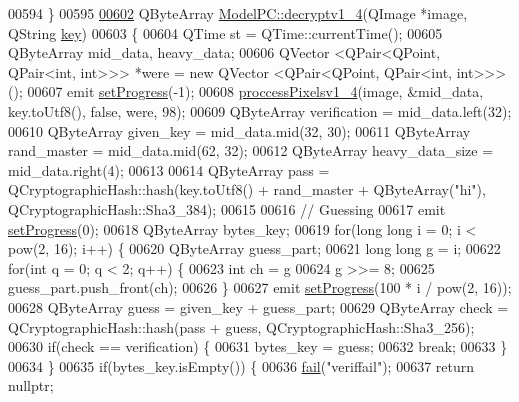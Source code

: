\begin{DoxyCode}
00594 \}
00595 
\hypertarget{modelpc_8cpp_source.tex_l00602}{}\hyperlink{class_model_p_c_a7a1f7d491e1bde16936190b9e90896b0}{00602} QByteArray \hyperlink{class_model_p_c_a7a1f7d491e1bde16936190b9e90896b0}{ModelPC::decryptv1\_4}(QImage *image, QString \hyperlink{namespace_errors_dict_setup_a09c268098d09ffb8e5504f30fa6d5dd9}{key})
00603 \{
00604     QTime st = QTime::currentTime();
00605     QByteArray mid\_data, heavy\_data;
00606     QVector <QPair<QPoint, QPair<int, int>>> *were = \textcolor{keyword}{new} QVector <QPair<QPoint, QPair<int, int>>>();
00607     emit \hyperlink{class_model_p_c_afdcd80f0ed5062e145a71f09b0897547}{setProgress}(-1);
00608     \hyperlink{class_model_p_c_a5cdb4d1d61ff62ee9d45b496a7dbf1fb}{proccessPixelsv1\_4}(image, &mid\_data, key.toUtf8(), \textcolor{keyword}{false}, were, 98);
00609     QByteArray verification = mid\_data.left(32);
00610     QByteArray given\_key = mid\_data.mid(32, 30);
00611     QByteArray rand\_master = mid\_data.mid(62, 32);
00612     QByteArray heavy\_data\_size = mid\_data.right(4);
00613 
00614     QByteArray pass = QCryptographicHash::hash(key.toUtf8() + rand\_master + QByteArray(\textcolor{stringliteral}{"hi"}), 
      QCryptographicHash::Sha3\_384);
00615 
00616     \textcolor{comment}{// Guessing}
00617     emit \hyperlink{class_model_p_c_afdcd80f0ed5062e145a71f09b0897547}{setProgress}(0);
00618     QByteArray bytes\_key;
00619     \textcolor{keywordflow}{for}(\textcolor{keywordtype}{long} \textcolor{keywordtype}{long} i = 0; i < pow(2, 16); i++) \{
00620         QByteArray guess\_part;
00621         \textcolor{keywordtype}{long} \textcolor{keywordtype}{long} g = i;
00622         \textcolor{keywordflow}{for}(\textcolor{keywordtype}{int} q = 0; q < 2; q++) \{
00623                 \textcolor{keywordtype}{int} ch = g %
00624                 g >>= 8;
00625                 guess\_part.push\_front(ch);
00626             \}
00627         emit \hyperlink{class_model_p_c_afdcd80f0ed5062e145a71f09b0897547}{setProgress}(100 * i / pow(2, 16));
00628         QByteArray guess = given\_key + guess\_part;
00629         QByteArray check = QCryptographicHash::hash(pass + guess, QCryptographicHash::Sha3\_256);
00630         \textcolor{keywordflow}{if}(check == verification) \{
00631             bytes\_key = guess;
00632             \textcolor{keywordflow}{break};
00633         \}
00634     \}
00635     \textcolor{keywordflow}{if}(bytes\_key.isEmpty()) \{
00636         \hyperlink{class_model_p_c_a47464b59b7e37fcee25e55475708aabd}{fail}(\textcolor{stringliteral}{"veriffail"});
00637         \textcolor{keywordflow}{return} \textcolor{keyword}{nullptr};

\end{DoxyCode}
